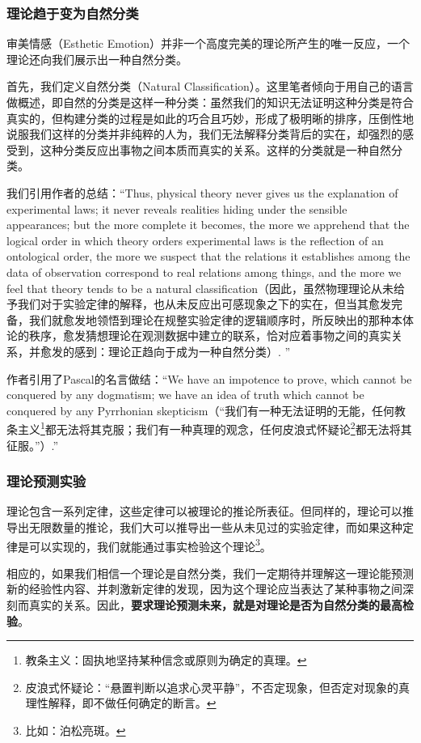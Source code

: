 \documentclass[12pt, a4paper, oneside]{ctexart}
\renewcommand{\b}{\textbf}
\newcommand{\f}{\footnote}
\begin{document}
\subsubsection{理论趋于变为自然分类}
审美情感（Esthetic Emotion）并非一个高度完美的理论所产生的唯一反应，一个理论还向我们展示出一种自然分类。

首先，我们定义自然分类（Natural Classification）。这里笔者倾向于用自己的语言做概述，即自然的分类是这样一种分类：虽然我们的知识无法证明这种分类是符合真实的，但构建分类的过程是如此的巧合且巧妙，形成了极明晰的排序，压倒性地说服我们这样的分类并非纯粹的人为，我们无法解释分类背后的实在，却强烈的感受到，这种分类反应出事物之间本质而真实的关系。这样的分类就是一种自然分类。

我们引用作者的总结：“Thus, physical theory never gives us the explanation of experimental laws; it never reveals realities hiding under the sensible appearances; but the more complete it becomes, the more we apprehend that the logical order in which theory orders experimental laws is the reflection of an ontological order, the more we suspect that the relations it establishes among the data of observation correspond to real relations among things, and the more we feel that theory tends to be a natural classification（因此，虽然物理理论从未给予我们对于实验定律的解释，也从未反应出可感现象之下的实在，但当其愈发完备，我们就愈发地领悟到理论在规整实验定律的逻辑顺序时，所反映出的那种本体论的秩序，愈发猜想理论在观测数据中建立的联系，恰对应着事物之间的真实关系，并愈发的感到：理论正趋向于成为一种自然分类）. ”

作者引用了Pascal的名言做结：“We have an impotence to prove, which cannot be conquered by any dogmatism; we have an idea of truth which cannot be conquered by any Pyrrhonian skepticism（“我们有一种无法证明的无能，任何教条主义\f{教条主义：固执地坚持某种信念或原则为确定的真理。}都无法将其克服；我们有一种真理的观念，任何皮浪式怀疑论\f{皮浪式怀疑论：“悬置判断以追求心灵平静”，不否定现象，但否定对现象的真理性解释，即不做任何确定的断言。}都无法将其征服。”）.”

\subsubsection{理论预测实验}
理论包含一系列定律，这些定律可以被理论的推论所表征。但同样的，理论可以推导出无限数量的推论，我们大可以推导出一些从未见过的实验定律，而如果这种定律是可以实现的，我们就能通过事实检验这个理论\f{比如：泊松亮斑。}。

相应的，如果我们相信一个理论是自然分类，我们一定期待并理解这一理论能预测新的经验性内容、并刺激新定律的发现，因为这个理论应当表达了某种事物之间深刻而真实的关系。因此，\b{要求理论预测未来，就是对理论是否为自然分类的最高检验}。
\end{document}
